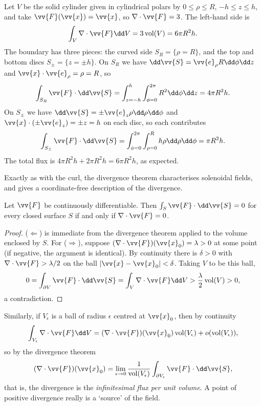\begin{example}
	Let $V$ be the solid cylinder given in cylindrical polars by $0 \leq \rho \leq R$, $-h \leq z \leq h$, and take $\vv{F}(\vv{x}) = \vv{x}$, so $\nabla \cdot \vv{F} = 3$. The left-hand side is
	$$
	\int_V \nabla \cdot \vv{F} \dd V = 3 \operatorname{vol}(V) = 6 \pi R^2 h.
	$$
	The boundary has three pieces: the curved side $S_R = \{\rho = R\}$, and the top and bottom discs $S_\pm = \{z = \pm h\}$. On $S_R$ we have $\dd \vv{S} = \vv{e}_\rho R \dd \phi \dd z$ and $\vv{x} \cdot \vv{e}_\rho = \rho = R$, so
	$$
	\int_{S_R} \vv{F} \cdot \dd \vv{S} = \int_{z = -h}^{h}\int_{\phi = 0}^{2 \pi} R^2 \dd \phi \dd z = 4 \pi R^2 h.
	$$
	On $S_\pm$ we have $\dd \vv{S} = \pm \vv{e}_z \rho \dd \rho \dd \phi$ and $\vv{x} \cdot (\pm\vv{e}_z) = \pm z = h$ on each disc, so each contributes
	$$
	\int_{S_\pm} \vv{F} \cdot \dd \vv{S} = \int_{\phi = 0}^{2\pi} \int_{\rho = 0}^R h \rho \dd \rho \dd \phi = \pi R^2 h.
	$$
	The total flux is $4 \pi R^2 h + 2 \pi R^2 h = 6 \pi R^2 h$, as expected.
\end{example}

Exactly as with the curl, the divergence theorem characterises solenoidal fields, and gives a coordinate-free description of the divergence.

\begin{proposition}
	Let $\vv{F}$ be continuously differentiable. Then $\int_S \vv{F} \cdot \dd \vv{S} = 0$ for every closed surface $S$ if and only if $\nabla \cdot \vv{F} = 0$.
\end{proposition}
\begin{proof}
	($\Leftarrow$) is immediate from the divergence theorem applied to the volume enclosed by $S$. For ($\Rightarrow$), suppose $(\nabla \cdot \vv{F})(\vv{x}_0) = \lambda > 0$ at some point (if negative, the argument is identical). By continuity there is $\delta > 0$ with $\nabla \cdot \vv{F} > \lambda/2$ on the ball $|\vv{x} - \vv{x}_0| < \delta$. Taking $V$ to be this ball,
	$$
	0 = \int_{\partial V} \vv{F} \cdot \dd \vv{S} = \int_V \nabla \cdot \vv{F} \dd V > \frac{\lambda}{2}\operatorname{vol}(V) > 0,
	$$
	a contradiction.
\end{proof}

Similarly, if $V_\epsilon$ is a ball of radius $\epsilon$ centred at $\vv{x}_0$, then by continuity
$$
\int_{V_\epsilon} \nabla \cdot \vv{F} \dd V = (\nabla \cdot \vv{F})(\vv{x}_0) \operatorname{vol}(V_\epsilon) + o(\operatorname{vol}(V_\epsilon)),
$$
so by the divergence theorem
$$
(\nabla \cdot \vv{F})(\vv{x}_0) = \lim_{\epsilon \to 0} \frac{1}{\operatorname{vol}(V_\epsilon)} \int_{\partial V_\epsilon} \vv{F} \cdot \dd \vv{S},
$$
that is, the divergence is the \emph{infinitesimal flux per unit volume}. A point of positive divergence really is a `source' of the field.

